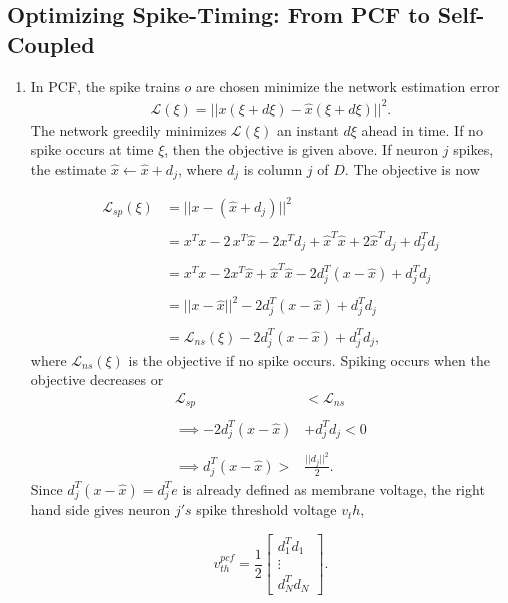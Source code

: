 \subsection{Optimizing Spike-Timing: From PCF to Self-Coupled} 

\begin{enumerate}
\item In PCF, the spike trains $o$ are chosen minimize the network estimation error
\begin{align}
    \mathcal{L}(\xi) =  || x(\xi + d\xi) - \hat{x}(\xi + d\xi) ||^2. 
\end{align}
The network greedily minimizes $\mathcal{L}(\xi)$ an instant $d\xi$ ahead in time. If no spike occurs at time $\xi$, then the objective is given above. If neuron $j$ spikes, the estimate $\hat{x} \leftarrow \hat{x} + d_j$, where $d_j$ is column $j$ of $D$. The objective is now

\begin{align*}
\mathcal{L}_{sp}(\xi) &= ||x - (\hat{x} + d_j)||^2
\\
\\
&= x^T x - 2 \, x^T \hat{x} - 2 x^T d_j + \hat{x}^T \hat{x} + 2 \hat{x}^T d_j + d_j^T d_j
\\
\\
&= x^T x - 2 x^T \hat{x} + \hat{x}^T \hat{x} - 2 d_j^T(x - \hat{x}) + d_j^T d_j
\\
\\
&= ||x - \hat{x}||^2 - 2 d_j^T(x - \hat{x}) + d_j^T d_j
\\
\\
&= 
\mathcal{L}_{ns}(\xi) - 2 d_j^T(x - \hat{x}) + d_j^T d_j,
\end{align*}
where $\mathcal{L}_{ns}(\xi)$ is the objective if no spike occurs. Spiking occurs when the objective decreases or
\begin{align*}
\mathcal{L}_{sp} &< \mathcal{L}_{ns}
\\
\\
\implies
- 2 d_j^T(x - \hat{x}) &+ d_j^T d_j < 0
\\
\\
\implies
d_j^T(x - \hat{x}) >& \frac{||d_j||^2}{2}.
\end{align*}
Since $d_j^T(x-\hat{x}) = d_j^Te$ is already defined as membrane voltage, the right hand side gives neuron $j's$ spike threshold voltage $v_th$,

$$
v_{th}^{pcf} = \frac{1}{2}
\begin{bmatrix}
d_1^T d_1
\\
\vdots
\\
d_N^T d_N
\end{bmatrix}.
$$


\end{enumerate}
